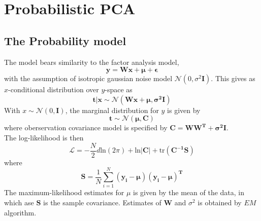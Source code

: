 \chapter{Probabilistic PCA}
\section{The Probability model}
The model bears similarity to the factor analysis model, 
\begin{equation}
\mathbf{y = Wx + \mu + \epsilon}
\end{equation}
with the assumption of isotropic gaussian noise model $\mathcal{N}(0, \sigma^2\mathbf{I})$. This gives as $x$-conditional distribution over $y$-space as
\begin{equation}
\mathbf{t|x \sim \mathcal{N}(Wx + \mu, \sigma^2I)}
\end{equation}
With $x \sim \mathcal{N}(0, \mathbf{I})$, the marginal distribution for $y$ is given by 
\begin{equation}
\mathbf{t \sim \mathcal{N}(\mu, C)}
\end{equation}
where oberservation covariance model is specified by $\mathbf{C = WW^T + \sigma^2I}$. \\
The log-likelihood is then 
\begin{equation}
\mathcal{L} = -\frac{N}{2}{d \text{ln}(2\pi) + \text{ln}|\mathbf{C}| + \text{tr}(\mathbf{C^{-1}S})}
\end{equation}
where 
\begin{equation}
	\mathbf{S} = \frac{1}{N}\sum_{i=1}^N\mathbf{(y_i - \mu)(y_i - \mu)^T}
\end{equation}
The maximum-likelihood estimates for $\mu$ is given by the mean of the data, in which ase $\mathbf{S}$ is the sample covariance. Estimates of $\mathbf{W}$ and $\sigma^2$ is obtained by $EM$ algorithm.
\pagebreak
